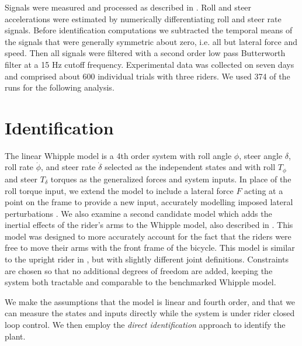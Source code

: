 \documentclass[a4paper]{article}
\begin{document}
Signals were measured and processed as described in \cite{Moore2012}. Roll and 
steer accelerations were estimated by numerically differentiating
roll and steer rate signals. Before identification computations we subtracted
the temporal means of the signals that were generally symmetric about zero,
i.e. all but lateral force and speed. Then all signals were filtered
with a second order low pass Butterworth filter at a 15 Hz cutoff frequency.
Experimental data was collected on seven days and comprised
about 600 individual trials with three riders. We used 374 of the
runs for the following analysis.


\section{Identification}
\label{sec:identification}


The linear Whipple model is a 4th order system with roll angle $\phi$, steer
angle $\delta$, roll rate $\dot{\phi}$, and steer rate $\dot{\delta}$ selected
as the independent states and with roll $T_\phi$ and steer $T_\delta$ torques
as the generalized forces and system inputs. In place of the roll torque input,
we extend the model to include a lateral force $F$ acting at a point on the
frame to provide a new input, accurately modelling imposed lateral
perturbations \cite{Moore2012}.  We also examine a second
candidate model which adds the inertial effects of the rider's arms to the
Whipple model, also described in \cite{Moore2012}. This model was designed to
more accurately account for the fact that the riders were free to move their
arms with the front frame of the bicycle. This model is similar to
the upright rider in \cite{Schwab2010}, but with slightly different joint
definitions. Constraints are chosen so that no additional degrees of freedom
are added, keeping the system both tractable and comparable to the benchmarked
Whipple model.

We make the assumptions that the model is 
linear and fourth order, and that we can measure the states and inputs
directly while the system is under rider closed loop control. We then
employ the \emph{direct identification} approach to identify the plant.
\end{document}
